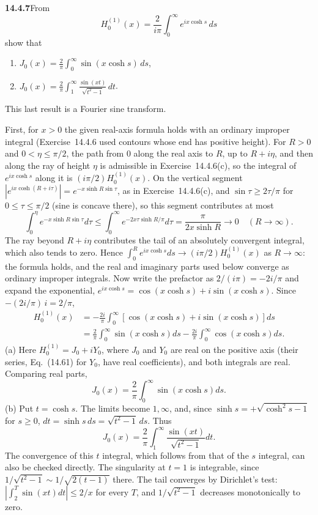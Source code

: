 \par\bigskip
\noindent\textbf{14.4.7}\quad From
\[
H_{0}^{(1)}(x)=\frac{2}{i\pi}\int_{0}^{\infty}e^{ix\cosh s}\,ds
\]
show that
\begin{enumerate}
\item[(a)] $J_{0}(x)=\displaystyle\frac{2}{\pi}
\int_{0}^{\infty}\sin(x\cosh s)\,ds$,
\item[(b)] $J_{0}(x)=\displaystyle\frac{2}{\pi}
\int_{1}^{\infty}\frac{\sin(xt)}{\sqrt{t^{2}-1}}\,dt$.
\end{enumerate}
This last result is a Fourier sine transform.
\par{}
\solution
{}
First, for $x>0$ the given real-axis formula holds with an ordinary
improper integral (Exercise~14.4.6 used contours whose end has
positive height). For $R>0$ and $0<\eta\le\pi/2$, the path from $0$
along the real axis to $R$, up to $R+i\eta$, and then along the ray
of height $\eta$ is admissible in Exercise~14.4.6(c), so the
integral of $e^{ix\cosh s}$ along it is $(i\pi/2)H_0^{(1)}(x)$. On
the vertical segment $|e^{ix\cosh(R+i\tau)}|=e^{-x\sinh R\sin\tau}$,
as in Exercise~14.4.6(c), and $\sin\tau\ge2\tau/\pi$ for
$0\le\tau\le\pi/2$ (sine is concave there), so this segment
contributes at most
\[
\int_0^\eta e^{-x\sinh R\sin\tau}d\tau
\le\int_0^\infty e^{-2x\tau\sinh R/\pi}d\tau
=\frac{\pi}{2x\sinh R}\longrightarrow0
\quad(R\to\infty).
\]
The ray beyond $R+i\eta$ contributes the tail of an absolutely
convergent integral, which also tends to zero. Hence
$\int_0^Re^{ix\cosh s}ds\to(i\pi/2)H_0^{(1)}(x)$ as $R\to\infty$:
the formula holds, and the real and imaginary parts used below
converge as ordinary improper integrals.
Now write the prefactor as $2/(i\pi)=-2i/\pi$ and expand
the exponential, $e^{ix\cosh s}=\cos(x\cosh s)+i\sin(x\cosh s)$.
Since $-(2i/\pi)\,i=2/\pi$,
\begin{align*}
H_0^{(1)}(x)
&=-\frac{2i}{\pi}\int_0^\infty
[\cos(x\cosh s)+i\sin(x\cosh s)]ds\\
&=\frac2\pi\int_0^\infty\sin(x\cosh s)ds
-\frac{2i}{\pi}\int_0^\infty\cos(x\cosh s)ds.
\end{align*}
(a) Here $H_0^{(1)}=J_0+iY_0$, where $J_0$ and $Y_0$ are real on the
positive axis (their series, Eq.~(14.61) for $Y_0$, have real
coefficients), and both integrals are real. Comparing real parts,
\[
\boxed{J_0(x)=\frac2\pi\int_0^\infty\sin(x\cosh s)ds}.
\]
(b) Put $t=\cosh s$. The limits become $1,\infty$, and, since
$\sinh s=+\sqrt{\cosh^2s-1}$ for $s\ge0$,
$dt=\sinh s\,ds=\sqrt{t^2-1}\,ds$. Thus
\[
\boxed{J_0(x)=\frac2\pi\int_1^\infty
\frac{\sin(xt)}{\sqrt{t^2-1}}dt}.
\]
The convergence of this $t$ integral, which follows from that of
the $s$ integral, can also be checked directly. The singularity at
$t=1$ is integrable, since $1/\sqrt{t^2-1}\sim1/\sqrt{2(t-1)}$
there. The tail converges by Dirichlet's test:
$|\int_2^T\sin(xt)dt|\le2/x$ for every $T$, and $1/\sqrt{t^2-1}$
decreases monotonically to zero.

